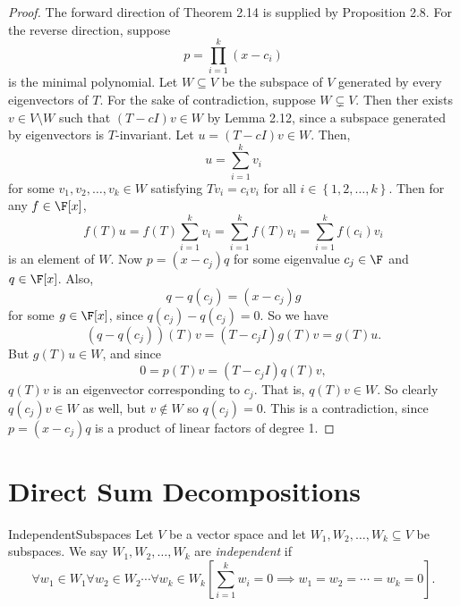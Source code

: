\documentclass[math_245.tex]{subfiles}
\begin{document}
    \begin{proof}
        The forward direction of Theorem 2.14 is supplied by Proposition 2.8. For the reverse direction, suppose
        \begin{equation*}
            p = \prod^{k}_{i=1} \left( x-c_i \right) 
        \end{equation*}
        is the minimal polynomial. Let $W\subseteq V$ be the subspace of $V$ generated by every eigenvectors of $T$. For the sake of contradiction, suppose $W\subsetneq V$. Then ther exists $v\in V\setminus W$ such that $(T-cI)v\in W$ by Lemma 2.12, since a subspace generated by eigenvectors is $T$-invariant. Let $u = \left( T - cI \right)v\in W$. Then,
        \begin{equation*}
            u = \sum^{k}_{i=1} v_i
        \end{equation*}
        for some $v_1, v_2, \ldots, v_k\in W$ satisfying $Tv_i = c_iv_i$ for all $i\in \left\lbrace 1, 2, \ldots, k \right\rbrace$. Then for any $f\in \F[x]$,
        \begin{equation*}
            f(T)u = f(T) \sum^{k}_{i=1} v_i = \sum^{k}_{i=1} f(T)v_i = \sum^{k}_{i=1} f(c_i)v_i
        \end{equation*}
        is an element of $W$. Now $p = (x-c_j)q$ for some eigenvalue $c_j\in\F$ and $q\in \F[x]$. Also,
        \begin{equation*}
            q - q(c_j) = (x-c_j)g
        \end{equation*}
        for some $g\in\F[x]$, since $q(c_j) - q(c_j) = 0$. So we have
        \begin{equation*}
            \left( q -q(c_j) \right)(T)v = \left( T-c_jI \right) g(T)v = g(T)u.
        \end{equation*}
        But $g(T)u\in W$, and since
        \begin{equation*}
            0 = p(T)v = (T-c_jI)q(T)v,
        \end{equation*}
        $q(T)v$ is an eigenvector corresponding to $c_j$. That is, $q(T)v\in W$. So clearly $q(c_j)v\in W$ as well, but $v\notin W$ so $q(c_j) = 0$. This is a contradiction, since $p = (x-c_j)q$ is a product of linear factors of degree 1.
    \end{proof}

    \section{Direct Sum Decompositions}
    
    \begin{definition}{Independent}{Subspaces}
        Let $V$ be a vector space and let $W_1, W_2, \ldots, W_k\subseteq V$ be subspaces. We say $W_1, W_2, \ldots, W_k$ are \emph{independent} if
        \begin{equation*}
            \forall w_1\in W_1\forall w_2\in W_2\cdots\forall w_k\in W_k \left[ \sum^{k}_{i=1} w_i = 0 \implies w_1 = w_2 = \cdots = w_k = 0 \right]. 
        \end{equation*}
    \end{definition}
\end{document}
